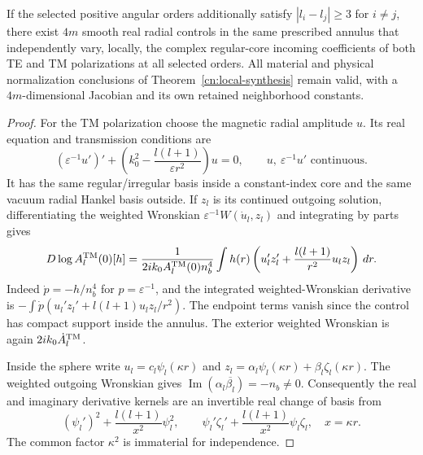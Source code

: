 \begin{corollary}
\label{cn:both-synthesis}
If the selected positive angular orders additionally satisfy
$|l_i-l_j|\geq3$ for $i\ne j$, there exist $4m$ smooth real radial
controls in the same prescribed annulus that independently vary,
locally, the complex regular-core incoming coefficients of both
TE and TM polarizations at all selected orders.  All material and
physical normalization conclusions of
Theorem~\ref{cn:local-synthesis} remain valid, with a $4m$-dimensional
Jacobian and its own retained neighborhood constants.
\end{corollary}
\begin{proof}
For the TM polarization choose the magnetic radial amplitude $u$.
Its real equation and transmission conditions are
\begin{equation}\label{cn:tm-ode}
 (\varepsilon^{-1}u')'
       +\left(k_0^2-\frac{l(l+1)}{\varepsilon r^2}\right)u=0,
 \qquad u,\ \varepsilon^{-1}u'\text{ continuous}.
\end{equation}
It has the same regular/irregular basis inside a constant-index core
and the same vacuum radial Hankel basis outside.  If $z_l$ is its
continued outgoing solution, differentiating the weighted Wronskian
$\varepsilon^{-1}W(\dot u_l,z_l)$ and integrating by parts gives
\begin{equation}\label{cn:tm-amplitude-derivative}
 D\log A_l^{\rm TM}(0)[h]
  =\frac{1}{2ik_0 A_l^{\rm TM}(0)n_b^4}
       \int h(r)\left(u_l'z_l'
                  +\frac{l(l+1)}{r^2}u_lz_l\right)\,dr.
\end{equation}
Indeed $\dot p=-h/n_b^4$ for $p=\varepsilon^{-1}$,
and the integrated weighted-Wronskian derivative is
$-\int\dot p(u_l'z_l'+l(l+1)u_lz_l/r^2)$.
The endpoint terms vanish since the control has compact support
inside the annulus.  The exterior weighted Wronskian is again
$2ik_0\dot A_l^{\rm TM}$.

Inside the sphere write $u_l=c_l\psi_l(\kappa r)$ and
$z_l=\alpha_l\psi_l(\kappa r)+\beta_l\zeta_l(\kappa r)$.
The weighted outgoing Wronskian gives
$\operatorname{Im}(\alpha_l\overline{\beta_l})=-n_b\ne0$.
Consequently the real and imaginary derivative kernels are an
invertible real change of basis from
\begin{equation}\label{cn:tm-kernels}
 (\psi_l')^2+\frac{l(l+1)}{x^2}\psi_l^2,
 \qquad
 \psi_l'\zeta_l'+\frac{l(l+1)}{x^2}\psi_l\zeta_l,
 \quad x=\kappa r.
\end{equation}
The common factor $\kappa^2$ is immaterial for independence.


\end{proof}
